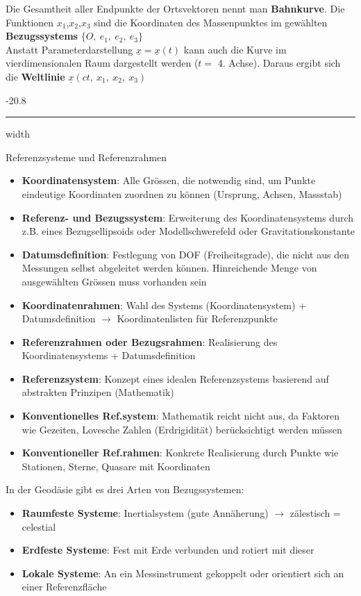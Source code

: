 \documentclass[8pt, landscape, fleqn]{scrartcl}
\makeatletter
\renewcommand{\subsubsection}{\@startsection{subsubsection}{1}{0mm}%
{-2\baselineskip}{0.8\baselineskip}%
{\hrule depth 0.2pt width\columnwidth\vspace*{1.2em}\normalsize\bfseries\rmfamily}}
\makeatother
\begin{document}
\begin{multicols*}{3}
Die Gesamtheit aller Endpunkte der Ortsvektoren nennt man \textbf{Bahnkurve}. Die Funktionen $x_1$,$x_2$,$x_3$ sind die Koordinaten des Massenpunktes im gewählten \textbf{Bezugssystems} $\{O,~e_1,~e_2,~e_3\}$ \\

Anstatt Parameterdarstellung $\underline{x}=\underline{x}(t)$ kann auch die Kurve im vierdimensionalen Raum dargestellt werden ($t =$ 4. Achse). Daraus ergibt sich die \textbf{Weltlinie} $\underline{x}(ct,~x_1,~x_2,~x_3)$

\subsubsection{Referenzsysteme und Referenzrahmen}

\begin{itemize}
    \item \textbf{Koordinatensystem}: Alle Grössen, die notwendig sind, um Punkte eindeutige Koordinaten zuordnen zu können (Ursprung, Achsen, Massstab)
    \item \textbf{Referenz- und Bezugssystem}: Erweiterung des Koordinatensystems durch z.B. eines Bezugsellipsoids oder Modellschwerefeld oder Gravitationskonstante
    \item \textbf{Datumsdefinition}: Festlegung von DOF (Freiheitsgrade), die nicht aus den Messungen selbst abgeleitet werden können. Hinreichende Menge von ausgewählten Grössen muss vorhanden sein 
    \item \textbf{Koordinatenrahmen}: Wahl des Systems (Koordinatensystem) + Datumsdefinition $\rightarrow$ Koordinatenlisten für Referenzpunkte
    \item \textbf{Referenzrahmen oder Bezugsrahmen}: Realisierung des Koordinatensystems + Datumsdefinition
    \item \textbf{Referenzsystem}: Konzept eines idealen Referenzsystems basierend auf abstrakten Prinzipen (Mathematik)
    \item \textbf{Konventionelles Ref.system}: Mathematik reicht nicht aus, da Faktoren wie Gezeiten, Lovesche Zahlen (Erdrigidität) berücksichtigt werden müssen
    \item \textbf{Konventioneller Ref.rahmen}: Konkrete Realisierung durch Punkte wie Stationen, Sterne, Quasare mit Koordinaten
\end{itemize}

In der Geodäsie gibt es drei Arten von Bezugssystemen:

\begin{itemize}
    \item \textbf{Raumfeste Systeme}: Inertialsystem (gute Annäherung) $\rightarrow$ zälestisch = celestial
    \item \textbf{Erdfeste Systeme}: Fest mit Erde verbunden und rotiert mit dieser
    \item \textbf{Lokale Systeme}: An ein Messinstrument gekoppelt oder orientiert sich an einer Referenzfläche
\end{itemize}


\end{multicols*}
\end{document}
